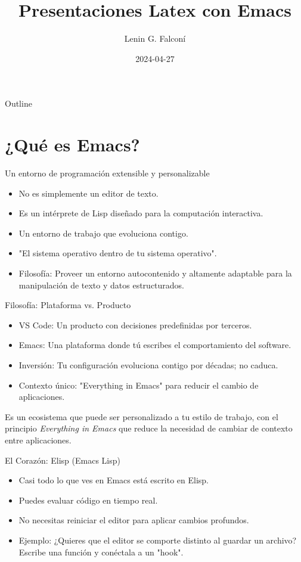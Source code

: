 \documentclass[presentation]{beamer}
\author{Lenin G. Falconí}
\date{2024-04-27}
\title{Presentaciones Latex con Emacs}
\begin{document}
\maketitle
\begin{frame}{Outline}
\tableofcontents
\end{frame}



\section{¿Qué es Emacs?}
\label{sec:orgaf099d7}
\begin{frame}[allowframebreaks]{Un entorno de programación extensible y personalizable}
\begin{itemize}
\item No es simplemente un editor de texto.
\item Es un \alert{intérprete de Lisp} diseñado para la computación interactiva.
\item Un entorno de trabajo que evoluciona contigo.
\item "El sistema operativo dentro de tu sistema operativo".
\item Filosofía: Proveer un entorno autocontenido y altamente adaptable
para la manipulación de texto y datos estructurados.
\end{itemize}
\end{frame}

\begin{frame}[allowframebreaks]{Filosofía: Plataforma vs. Producto}
\begin{itemize}
\item \alert{\alert{VS Code:}} Un producto con decisiones predefinidas por terceros.
\item \alert{\alert{Emacs:}} Una plataforma donde tú escribes el comportamiento del software.
\item \alert{\alert{Inversión:}} Tu configuración evoluciona contigo por décadas; no caduca.
\item \alert{\alert{Contexto único:}} "Everything in Emacs" para reducir el cambio de
aplicaciones.
\end{itemize}

Es un ecosistema que puede ser personalizado a tu estilo de trabajo,
con el principio \emph{Everything in Emacs} que reduce la necesidad de
cambiar de contexto entre aplicaciones.
\end{frame}

\begin{frame}[allowframebreaks]{El Corazón: Elisp (Emacs Lisp)}
\begin{itemize}
\item Casi todo lo que ves en Emacs está escrito en Elisp.
\item Puedes evaluar código en tiempo real.
\item No necesitas reiniciar el editor para aplicar cambios profundos.
\item \alert{Ejemplo:} ¿Quieres que el editor se comporte distinto al guardar un archivo? Escribe una función y conéctala a un "hook".
\end{itemize}
\end{frame}
\end{document}
